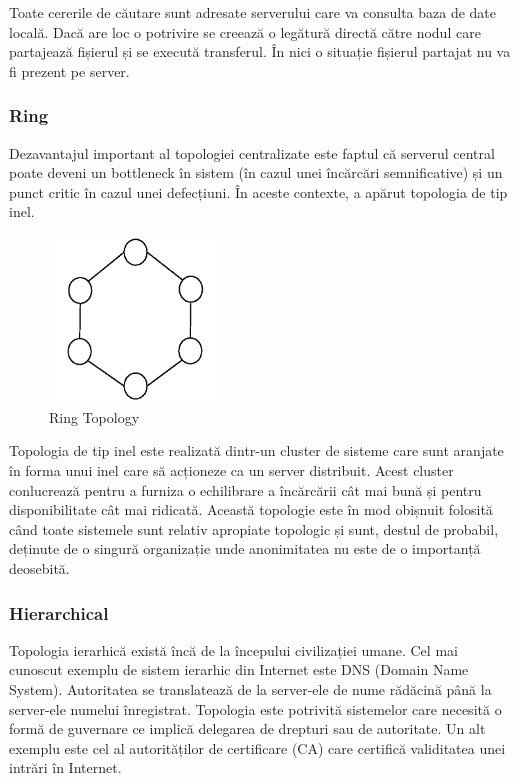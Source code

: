 Toate cererile de căutare sunt adresate serverului care va consulta baza de
date locală. Dacă are loc o potrivire se creează o legătură directă către
nodul care partajează fișierul și se execută transferul. În nici o situație
fișierul partajat nu va fi prezent pe server.

\subsubsection{Ring}

Dezavantajul important al topologiei centralizate este faptul că serverul
central poate deveni un bottleneck în sistem (în cazul unei încărcări
semnificative) și un punct critic în cazul unei defecțiuni. În aceste
contexte, a apărut topologia de tip inel.

\begin{figure}
  \centering
  \includegraphics[width=0.4\textwidth]{src/img/p2p-systems/ring}
  \caption{Ring Topology}
  \label{fig:p2p-systems:ring}
\end{figure}

Topologia de tip inel este realizată dintr-un cluster de sisteme care sunt
aranjate în forma unui inel care să acționeze ca un server distribuit. Acest
cluster conlucrează pentru a furniza o echilibrare a încărcării cât mai bună
și pentru disponibilitate cât mai ridicată. Această topologie este în mod
obișnuit folosită când toate sistemele sunt relativ apropiate topologic și
sunt, destul de probabil, deținute de o singură organizație unde anonimitatea
nu este de o importanță deosebită.

\subsubsection{Hierarchical}

Topologia ierarhică există încă de la începului civilizației umane. Cel mai
cunoscut exemplu de sistem ierarhic din Internet este DNS (Domain Name
System). Autoritatea se translatează de la server-ele de nume rădăcină până la
server-ele numelui înregistrat. Topologia este potrivită sistemelor care
necesită o formă de guvernare ce implică delegarea de drepturi sau de
autoritate. Un alt exemplu este cel al autorităților de certificare (CA) care
certifică validitatea unei intrări în Internet.

